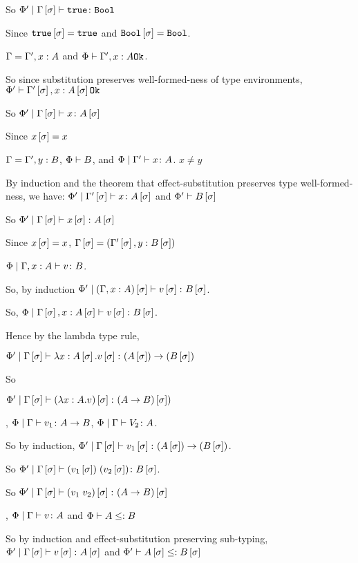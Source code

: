 {    So $\etyperelation{\P'}{\G\ssi}{\t}{\B}$

    Since $\t\ssi=\t$ and $\B\ssi=\B$.
   
    \bi $\G = \G', x:A$ and $\wellformedok{\P}{\G', x:A}$.

    So since substitution preserves well-formed-ness of type environments, $\wellformedok{\P'}{\G'\ssi, x:A\ssi}$

    So $\etyperelation{\P'}{\G\ssi}{x}{A\ssi}$

    Since $x\ssi = x$

    \bi $\G = \G', y:B$, $\wellformed{\P}{B}$, and $\etyperelation{\P}{\G'}{x}{A}$. $x \neq y$

    By induction and the theorem that effect-substitution preserves type well-formed-ness, we have: $\etyperelation{\P'}{\G'\ssi}{x}{A\ssi}$ and $\wellformed{\P'}{B\ssi}$

    So $\etyperelation{\P'}{\G\ssi}{x\ssi}{A\ssi}$

    Since $x\ssi = x$, $\G\ssi = (\G'\ssi, y:B\ssi)$

    
    \bi $\etyperelation{\P}{\gax}{v}{B}$.

    So, by induction $\etyperelation{\P'}{(\gax)\ssi}{v\ssi}{B\ssi}$.

    So, $\etyperelation{\P}{\G\ssi, x:A\ssi}{v\ssi}{B\ssi}$.

    Hence by the lambda type rule,

    $\etyperelation{\P'}{\G\ssi}{\lam{x}{A\ssi}{v\ssi}}{\fntype{(A\ssi)}{(B\ssi)}}$

    So
    
    $\etyperelation{\P'}{\G\ssi}{(\lam{x}{A}{v})\ssi}{(\ab)\ssi)}$

    \bi, $\gpetyperelation{v_1}{\ab}$, $\gpetyperelation{V_2}{A}$.

    So by induction, $\etyperelation{\P'}{\G\ssi}{v_1\ssi}{\fntype{(A\ssi)}{(B\ssi)}}$.

    So $\etyperelation{\P'}{\G\ssi}{\apply{(v_1\ssi)}{(v_2\ssi)}}{B\ssi}$.

    So $\etyperelation{\P'}{\G\ssi}{(\apply{v_1}{v_2})\ssi}{(\ab)\ssi}$

    \bi, $\gpetyperelation{v}{A}$ and $\wellformed{\P}{A\subtype B}$

    So by induction and effect-substitution preserving sub-typing, $\etyperelation{\P'}{\G\ssi}{v\ssi}{A\ssi}$ and $\wellformed{\P'}{A\ssi\subtype B\ssi}$

}
